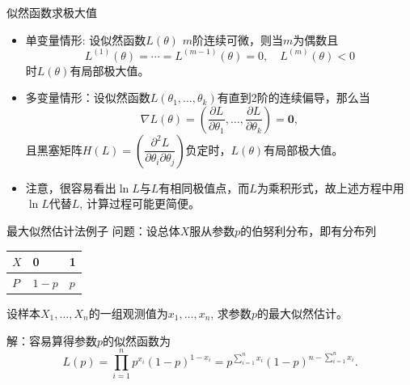 \begin{frame}

\begin{block}{似然函数求极大值}
\begin{itemize}
\item 单变量情形: 设似然函数$L(\theta)$ $m$阶连续可微，则当$m$为偶数且
$$L^{(1)}(\theta) = \cdots = L^{(m-1)}(\theta) = 0, \quad L^{(m)}(\theta) < 0$$
时$L(\theta)$有局部极大值。
\item 多变量情形：设似然函数$L(\theta_1,\ldots,\theta_k)$有直到2阶的连续偏导，那么当
$$\nabla L(\theta) = \left( \dfrac{\partial L}{\partial \theta_1}, \ldots, \dfrac{\partial L}{\partial \theta_k} \right) = \mathbf{0},$$
且黑塞矩阵$H(L) = \left( \dfrac{\partial^2 L}{\partial \theta_i \partial \theta_j} \right)$负定时，$L(\theta)$有局部极大值。
\item 注意，很容易看出$\ln L$与$L$有相同极值点，而$L$为乘积形式，故上述方程中用$\ln L$代替$L$, 计算过程可能更简便。
\end{itemize}
\end{block}

\end{frame}


\begin{frame}

\begin{block}{最大似然估计法例子}
问题：设总体$X$服从参数$p$的伯努利分布，即有分布列
\begin{center}
\renewcommand{\arraystretch}{1.3}
\begin{tabu} to 0.5\textwidth { X[c] | X[c] | X[c] }
\hline
$X$ & 0 & 1 \\
\hline
$P$ & $1-p$ & $p$ \\
\hline
\end{tabu}
\renewcommand{\arraystretch}{1}
\end{center}
设样本$X_1,\ldots,X_n$的一组观测值为$x_1,\ldots,x_n$, 求参数$p$的最大似然估计。

\vspace{1em}
\pause

解：容易算得参数$p$的似然函数为
$$L(p) = \prod\limits_{i=1}^n p^{x_i}(1-p)^{1-x_i} = p^{\sum\limits_{i=1}^n x_i} (1-p)^{n - \sum\limits_{i=1}^n x_i}.$$
\end{block}

\end{frame}


